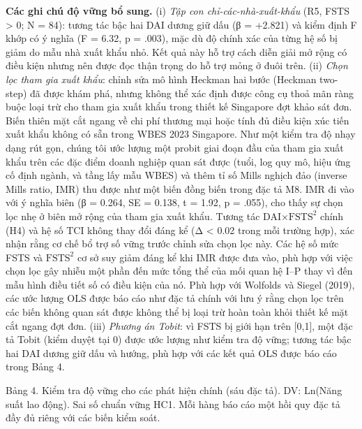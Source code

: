 \documentclass[12pt,a4paper]{article}
\begin{document}
\textbf{Các ghi chú độ vững bổ sung.} (i) \emph{Tập con
chỉ-các-nhà-xuất-khẩu} (R5, FSTS \textgreater{} 0; N = 84): tương tác
bậc hai DAI dương giữ dấu (β = +2.821) và kiểm định F khớp có ý nghĩa (F
= 6.32, p = .003), mặc dù độ chính xác của từng hệ số bị giảm do mẫu nhà
xuất khẩu nhỏ. Kết quả này hỗ trợ cách diễn giải mở rộng có điều kiện
nhưng nên được đọc thận trọng do hỗ trợ mỏng ở đuôi trên. (ii)
\emph{Chọn lọc tham gia xuất khẩu}: chỉnh sửa mô hình Heckman hai bước
(Heckman two-step) đã được khám phá, nhưng không thể xác định được công
cụ thoả mãn ràng buộc loại trừ cho tham gia xuất khẩu trong thiết kế
Singapore đợt khảo sát đơn. Biến thiên mặt cắt ngang về chi phí thương
mại hoặc tính đủ điều kiện xúc tiến xuất khẩu không có sẵn trong WBES
2023 Singapore. Như một kiểm tra độ nhạy dạng rút gọn, chúng tôi ước
lượng một probit giai đoạn đầu của tham gia xuất khẩu trên các đặc điểm
doanh nghiệp quan sát được (tuổi, log quy mô, hiệu ứng cố định ngành, và
tầng lấy mẫu WBES) và thêm tỉ số Mills nghịch đảo (inverse Mills ratio,
IMR) thu được như một biến đồng biến trong đặc tả M8. IMR đi vào với ý
nghĩa biên (β = 0.264, SE = 0.138, t = 1.92, p = .055), cho thấy sự chọn
lọc nhẹ ở biên mở rộng của tham gia xuất khẩu. Tương tác
DAI×\(\mathrm{FSTS}^2\) chính (H4) và hệ số TCI không thay đổi đáng kể
(\textbar Δ\textbar{} \textless{} 0.02 trong mỗi trường hợp), xác nhận
rằng cơ chế bổ trợ số vững trước chỉnh sửa chọn lọc này. Các hệ số mức
FSTS và \(\mathrm{FSTS}^2\) cơ sở suy giảm đáng kể khi IMR được đưa vào,
phù hợp với việc chọn lọc gây nhiễu một phần đến mức tổng thể của mối
quan hệ I--P thay vì đến mẫu hình điều tiết số có điều kiện của nó. Phù
hợp với Wolfolds và Siegel (2019), các ước lượng OLS được báo cáo như
đặc tả chính với lưu ý rằng chọn lọc trên các biến không quan sát được
không thể bị loại trừ hoàn toàn khỏi thiết kế mặt cắt ngang đợt đơn.
(iii) \emph{Phương án Tobit}: vì FSTS bị giới hạn trên {[}0,1{]}, một
đặc tả Tobit (kiểm duyệt tại 0) được ước lượng như kiểm tra độ vững;
tương tác bậc hai DAI dương giữ dấu và hướng, phù hợp với các kết quả
OLS được báo cáo trong Bảng 4.

Bảng 4. Kiểm tra độ vững cho các phát hiện chính (sáu đặc tả). DV:
Ln(Năng suất lao động). Sai số chuẩn vững HC1. Mỗi hàng báo cáo một hồi
quy đặc tả đầy đủ riêng với các biến kiểm soát.
\end{document}
